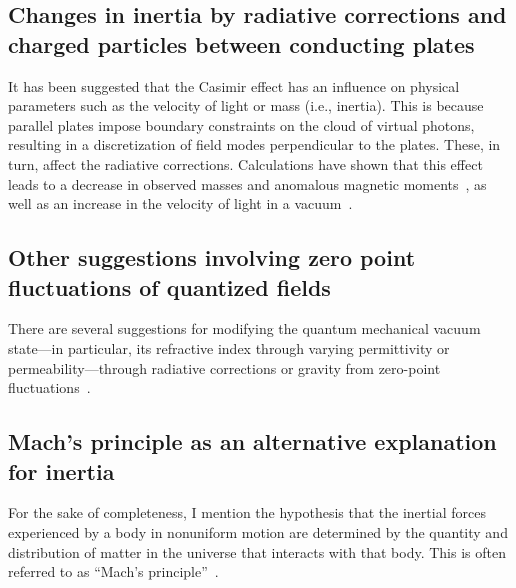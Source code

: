 \subsection{Changes in inertia by radiative corrections and charged particles between conducting plates}

It has been suggested that the Casimir effect has an influence on physical parameters such as the velocity of light or mass (i.e., inertia). This is because parallel plates impose boundary constraints on the cloud of virtual photons, resulting in a discretization of field modes perpendicular to the plates. These, in turn, affect the radiative corrections. Calculations have shown that this effect leads to a decrease in observed masses and anomalous magnetic moments~\cite{1995-mass,PhysRevD.34.1429}, as well as an increase in the velocity of light in a vacuum~\cite{scharnhorst,0305-4470-26-8-024,Scharnhorst-1998,milonni,Chiao:02}.


\subsection{Other suggestions involving zero point fluctuations of quantized fields}

There are several suggestions for modifying the quantum mechanical vacuum state---in particular, its refractive index through varying permittivity or permeability---through radiative corrections or gravity from zero-point fluctuations~\cite{dirac-aether, Sakharov_2000, Rueda_1998, Puthoff_1989, Haisch_2001, Bombelli_2005, Davis_2006, Robertson_2008}.

\subsection{Mach's principle as an alternative explanation for inertia}

For the sake of completeness, I mention the hypothesis that the inertial forces experienced by a body in nonuniform motion are determined by the quantity and distribution of matter in the universe that interacts with that body. This is often referred to as ``Mach's principle''~\cite{Barbour1995Aug}.
